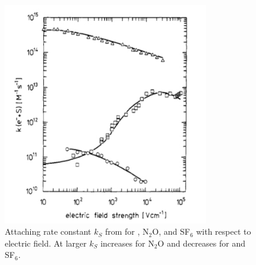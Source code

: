 \begin{figure}
\includegraphics[width=0.8\textwidth]{AttachmentRate}
\caption{Attaching rate constant $k_{S}$ from  for \otwo, N$_{2}$O, and SF$_{6}$ with respect to electric field.  At
larger \efield $k_{S}$ increases for N$_{2}$O and decreases for \otwo and SF$_{6}$.}
\label{fig:attachment_rate}
\end{figure}


